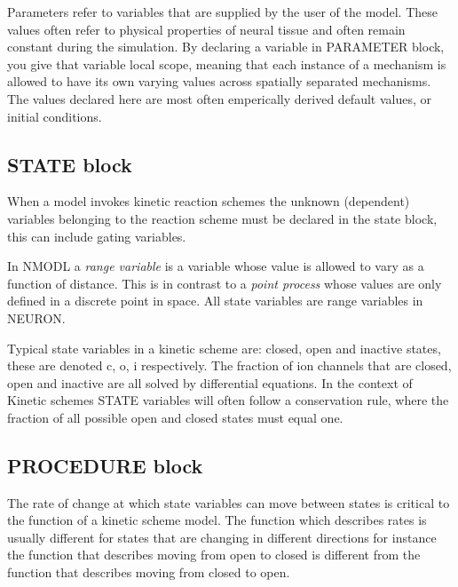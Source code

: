 \documentclass[draftspec]{ninemlspec}
\begin{document}
Parameters refer to variables that are supplied by the user of the model. These values often refer to physical properties of neural tissue and often remain constant during the simulation.  By declaring a variable in PARAMETER block, you give that variable local scope, meaning that each instance of a mechanism is allowed to have its own varying values across spatially separated mechanisms. The values declared here are most often emperically derived default values, or initial conditions.

\subsection{STATE block}

When a model invokes kinetic reaction schemes the unknown (dependent) variables belonging to the reaction scheme must be declared in the state block, this can include gating variables.

In NMODL a {\it range variable} is a variable whose value is allowed to vary as a function of distance. This is in contrast to a {\it point process} whose values are only defined in a discrete point in space. All state variables are range variables in NEURON.  

Typical state variables in a kinetic scheme are: closed, open and inactive states, these are denoted c, o, i respectively. The fraction of ion channels that are closed, open and inactive are all solved by differential equations. In the context of Kinetic schemes STATE variables will often follow a conservation rule, where the fraction of all possible open and closed states must equal one.


\subsection{PROCEDURE block}
The rate of change at which state variables can move between states is critical to the function of a kinetic scheme model. The function which describes rates is usually different for states that are changing in different directions for instance the function that describes moving from open to closed is different from the function that describes moving from closed to open.
\end{document}
